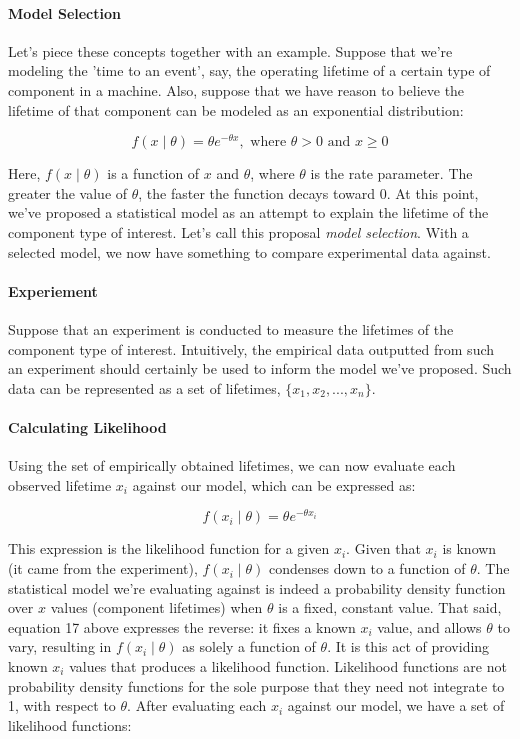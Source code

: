 \documentclass[12pt]{article}
\begin{document}
\newpage
\paragraph{Model Selection}
Let's piece these concepts together with an example. Suppose that we're modeling the 'time to an event', say, the operating lifetime of a certain type of component in a machine. Also, suppose that we have reason to believe the lifetime of that component can be modeled as an exponential distribution:

\begin{equation}
f(x \mid \theta) = \theta e^{-\theta x}, \text{ where } \theta > 0 \text{ and } x \ge 0
\end{equation}

\noindent Here, $f(x \mid \theta)$ is a function of $x$ and $\theta$, where $\theta$ is the rate parameter. The greater the value of $\theta$, the faster the function decays toward 0. At this point, we've proposed a statistical model as an attempt to explain the lifetime of the component type of interest. Let's call this proposal \textit{model selection}. With a selected model, we now have something to compare experimental data against. 

\paragraph{Experiement}
Suppose that an experiment is conducted to measure the lifetimes of the component type of interest. Intuitively, the empirical data outputted from such an experiment should certainly be used to inform the model we've proposed. Such data can be represented as a set of lifetimes, $\{x_1, x_2, ..., x_n\}$. 


\paragraph{Calculating Likelihood}
Using the set of empirically obtained lifetimes, we can now evaluate each observed lifetime $x_i$ against our model, which can be expressed as:

\begin{equation}
 f(x_i \mid \theta) = \theta e^{-\theta x_i}
\end{equation}

\noindent This expression is the likelihood function for a given $x_i$. Given that $x_i$ is known (it came from the experiment), $f(x_i \mid \theta)$ condenses down to a function of $\theta$. The statistical model we're evaluating against is indeed a probability density function over $x$ values (component lifetimes) when $\theta$ is a fixed, constant value. That said, equation 17 above expresses the reverse: it fixes a known $x_i$ value, and allows $\theta$ to vary, resulting in $f(x_i \mid \theta)$ as solely a function of $\theta$. It is this act of providing known $x_i$ values that produces a likelihood function. Likelihood functions are not probability density functions for the sole purpose that they need not integrate to 1, with respect to $\theta$. After evaluating each $x_i$ against our model, we have a set of likelihood functions:
\end{document}
